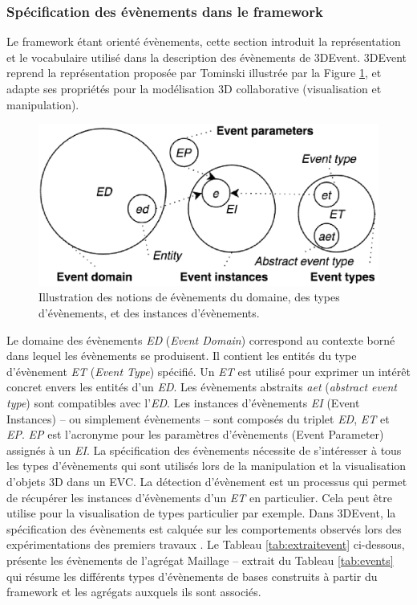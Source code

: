 \subsubsection{Spécification des évènements dans le framework}
Le framework étant orienté évènements, cette section introduit la représentation et 
le vocabulaire utilisé dans la description des évènements de 3DEvent. 3DEvent 
reprend la représentation proposée par Tominski \cite{Doktor-ingenieur2006} 
illustrée par la Figure \ref{fig:representation_event}, et adapte ses propriétés pour 
la modélisation 3D collaborative (visualisation et manipulation). 

\begin{figure}[ht]
	\centering
	\includegraphics[width=0.7\columnwidth]{eps/event4.eps}
	\caption{Illustration des notions de évènements du domaine, des types 
		d'évènements, et des instances d'évènements.}
	\label{fig:representation_event}
\end{figure}

Le domaine des évènements \textit{ED} (\textit{Event Domain}) correspond au 
contexte borné dans 
lequel les évènements se produisent. 
Il contient les entités du type d'évènement 
\textit{ET} (\textit{Event Type}) spécifié. Un \textit{ET} est utilisé pour exprimer un 
intérêt concret envers les entités d'un \textit{ED}. Les évènements abstraits 
\textit{aet} (\textit{abstract event type}) sont compatibles avec l'\textit{ED}. Les 
instances d'évènements \textit{EI} (Event Instances) -- ou simplement 
évènements -- sont composés du triplet \textit{ED}, \textit{ET} et \textit{EP}. 
\textit{EP} est l'acronyme pour les paramètres d'évènements (Event Parameter) 
assignés à un \textit{EI}. La spécification des évènements nécessite de 
s'intéresser à tous les types d'évènements qui sont utilisés lors de la manipulation 
et la visualisation d'objets 3D dans un \gls{EVC}. La détection d'évènement est un 
processus qui permet de récupérer les instances d'évènements d'un \textit{ET} en 
particulier. Cela peut être utilise pour la visualisation de types particulier par 
exemple. Dans 3DEvent, la spécification des évènements est calquée sur les 
comportements observés lors des expérimentations des premiers travaux 
\cite{Desprat2015a, Desprat2015b}. Le Tableau \ref{tab:extraitevent} ci-dessous, 
présente les évènements de l'agrégat Maillage -- extrait du Tableau 
\ref{tab:events} qui résume les 
différents types d'évènements de bases construits à partir du framework et les 
agrégats auxquels ils sont associés. 

